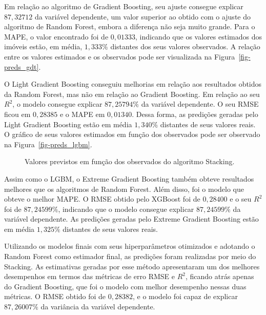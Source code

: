 \documentclass[
  12pt,
  a4paper,
]{scrreprt}
\begin{document}
\vspace{12pt}

Em relação ao algoritmo de Gradient Boosting, seu ajuste consegue
explicar \(87,32712%
\) da variável dependente, um valor superior ao obtido com o ajuste do
algoritmo de Random Forest, embora a diferença não seja muito grande.
Para o MAPE, o valor encontrado foi de \(0,01333\), indicando que os
valores estimados dos imóveis estão, em média, \(1,333\%\) distantes dos
seus valores observados. A relação entre os valores estimados e os
observados pode ser visualizada na Figura~\ref{fig-preds_gdt}.

\vspace{12pt}

O Light Gradient Boosting conseguiu melhorias em relação aos resultados
obtidos da Random Forest, mas não em relação ao Gradient Boosting. Em
relação ao seu \(R^2\), o modelo consegue explicar \(87,25794\%\) da
variável dependente. O seu RMSE ficou em \(0,28385\) e o MAPE em
\(0,01340\). Dessa forma, as predições geradas pelo Light Gradient
Boosting estão em média \(1,340\%\) distantes de seus valores reais. O
gráfico de seus valores estimados em função dos observados pode ser
observado na Figura~\ref{fig-preds_lgbm}.

\begin{figure}


\caption{\label{fig-preds_stacking}Valores previstos em função dos
observados do algoritmo Stacking.}

\end{figure}%

Assim como o LGBM, o Extreme Gradient Boosting também obteve resultados
melhores que os algoritmos de Random Forest. Além disso, foi o modelo
que obteve o melhor MAPE. O RMSE obtido pelo XGBoost foi de \(0,28400\)
e o seu \(R^2\) foi de \(87,24599\%\), indicando que o modelo consegue
explicar \(87,24599\%\) da variável dependente. As predições geradas
pelo Extreme Gradient Boosting estão em média \(1,325\%\) distantes de
seus valores reais.

\vspace{12pt}

Utilizando os modelos finais com seus hiperparâmetros otimizados e
adotando o Random Forest como estimador final, as predições foram
realizadas por meio do Stacking. As estimativas geradas por esse método
apresentaram um dos melhores desempenhos em termos das métricas de erro
RMSE e \(R^2\), ficando atrás apenas do Gradient Boosting, que foi o
modelo com melhor desempenho nessas duas métricas. O RMSE obtido foi de
\(0,28382\), e o modelo foi capaz de explicar \(87,26007\%\) da
variância da variável dependente.
\end{document}
